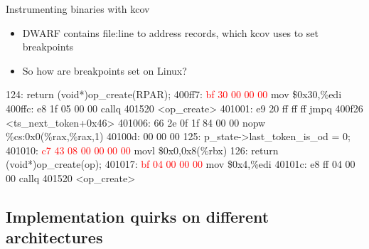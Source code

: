 \documentclass{beamer}
\begin{document}
\begin{frame}[fragile]{Instrumenting binaries with kcov}
  \begin{itemize}
    \item DWARF contains file:line to address records, which kcov uses to set breakpoints
    \item<3-> So how are breakpoints set on Linux?
  \end{itemize}
  \begin{Example}
    \begin{semiverbatim}
      \scriptsize
 124:     return (void*)op\_create(RPAR);
400ff7:       \textcolor<2>{red}{bf 30 00 00 00}          mov    \$0x30,\%edi
400ffc:       e8 1f 05 00 00          callq  401520 <op\_create>
401001:       e9 20 ff ff ff          jmpq   400f26 <ts\_next\_token+0x46>
401006:       66 2e 0f 1f 84 00 00    nopw   \%cs:0x0(\%rax,\%rax,1)
40100d:       00 00 00
 125: p\_state->last\_token\_is\_od = 0;
401010:       \textcolor<2>{red}{c7 43 08 00 00 00 00}    movl   \$0x0,0x8(\%rbx)
 126: return (void*)op\_create(op);
401017:       \textcolor<2>{red}{bf 04 00 00 00}          mov    \$0x4,\%edi
40101c:       e8 ff 04 00 00          callq  401520 <op\_create>
   \end{semiverbatim}
   \end{Example}
\end{frame}

\subsection{Implementation quirks on different architectures}
\end{document}
